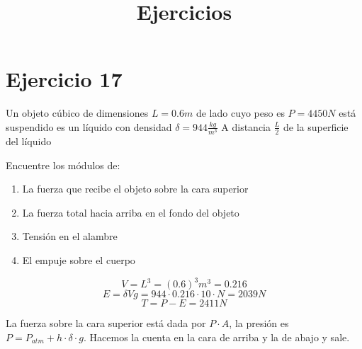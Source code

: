 \documentclass{article}
\title{Ejercicios}
\begin{document}
\maketitle
\section{Ejercicio 17}
Un objeto cúbico de dimensiones $L = 0.6m$ de lado cuyo peso es $P = 4450N$
está suspendido es un líquido con densidad $\delta = 944\frac{kg}{m^3}$
A distancia $\frac{L}{2}$ de la superficie del líquido

Encuentre los módulos de:
\begin{enumerate}
	\item La fuerza que recibe el objeto sobre la cara superior
	\item La fuerza total hacia arriba en el fondo del objeto
	\item Tensión en el alambre
	\item El empuje sobre el cuerpo
\end{enumerate}

\[
V = L^3 = (0.6)^3m^3 = 0.216
\]
\[
E = \delta V g = 944 \cdot 0.216 \cdot 10 \cdot N = 2039 N
\]
\[
	T = P - E = 2411N
\]

La fuerza sobre la cara superior está dada por $P\cdot A$, la presión es $P
= P_{atm} + h\cdot \delta \cdot g$. Hacemos la cuenta en la cara de arriba y
la de abajo y sale.
\end{document}
